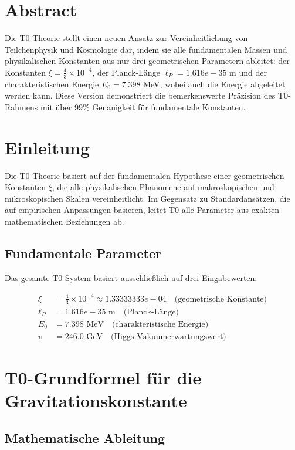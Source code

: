 \section*{Abstract}
		Die T0-Theorie stellt einen neuen Ansatz zur Vereinheitlichung von Teilchenphysik und Kosmologie dar, indem sie alle fundamentalen Massen und physikalischen Konstanten aus nur drei geometrischen Parametern ableitet: der Konstanten $\xi = \frac{4}{3} \times 10^{-4}$, der Planck-Länge $\ell_P = 1.616e-35$ m und der charakteristischen Energie $E_0 = 7.398$ MeV, wobei auch die Energie abgeleitet werden kann. Diese Version demonstriert die bemerkenswerte Präzision des T0-Rahmens mit über 99\% Genauigkeit für fundamentale Konstanten.

	
	\section{Einleitung}
	
	Die T0-Theorie basiert auf der fundamentalen Hypothese einer geometrischen Konstanten $\xi$, die alle physikalischen Phänomene auf makroskopischen und mikroskopischen Skalen vereinheitlicht. Im Gegensatz zu Standardansätzen, die auf empirischen Anpassungen basieren, leitet T0 alle Parameter aus exakten mathematischen Beziehungen ab.
	
	\subsection{Fundamentale Parameter}
	
	Das gesamte T0-System basiert ausschließlich auf drei Eingabewerten:
	
	\begin{align}
		\xi &= \frac{4}{3} \times 10^{-4} \approx 1.33333333e-04 \quad \text{(geometrische Konstante)} \\
		\ell_P &= 1.616e-35 \text{ m} \quad \text{(Planck-Länge)} \\
		E_0 &= 7.398 \text{ MeV} \quad \text{(charakteristische Energie)} \\
		v &= 246.0 \text{ GeV} \quad \text{(Higgs-Vakuumerwartungswert)}
	\end{align}
	
	\section{T0-Grundformel für die Gravitationskonstante}
	
	\subsection{Mathematische Ableitung}
	
